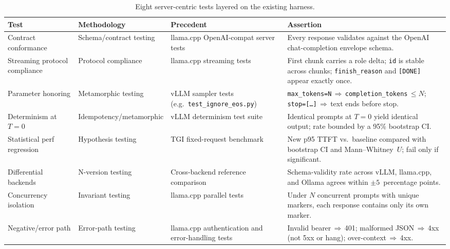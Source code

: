 \documentclass[sigconf,nonacm]{acmart}
\begin{document}
\begin{table}[!tbp]
\centering
\caption{Eight server-centric tests layered on the existing harness.}
\label{tab:methodology}
\small
\begin{tabular}{@{}p{2.8cm}p{3.0cm}p{3.1cm}p{6.8cm}@{}}
\toprule
\textbf{Test} & \textbf{Methodology} & \textbf{Precedent} & \textbf{Assertion} \\
\midrule
Contract conformance & Schema/contract testing & llama.cpp
OpenAI-compat server tests &
Every response validates against the OpenAI chat-completion envelope schema. \\
Streaming protocol compliance & Protocol compliance & llama.cpp streaming
tests &
First chunk carries a role delta; \texttt{id} is stable across chunks;
\texttt{finish\_reason} and \texttt{[DONE]} appear exactly once. \\
Parameter honoring & Metamorphic testing & vLLM sampler tests
(e.g.\ \texttt{test\_ignore\_eos.py}) &
\texttt{max\_tokens=N}\,$\Rightarrow$\,\texttt{completion\_tokens}$\,\leq N$;
\texttt{stop=[\dots]}\,$\Rightarrow$\,text ends before stop. \\
Determinism at $T{=}0$ & Idempotency/metamorphic & vLLM determinism
test suite &
Identical prompts at $T{=}0$ yield identical output; rate bounded by a
95\% bootstrap CI. \\
Statistical perf regression & Hypothesis testing & TGI fixed-request
benchmark~\cite{tgi} &
New p95 TTFT vs.\ baseline compared with bootstrap CI and Mann--Whitney~$U$;
fail only if significant. \\
Differential backends & N-version testing & Cross-backend reference
comparison &
Schema-validity rate across vLLM, llama.cpp, and Ollama agrees within
$\pm 5$~percentage points. \\
Concurrency isolation & Invariant testing & llama.cpp parallel tests &
Under $N$ concurrent prompts with unique markers, each response contains
only its own marker. \\
Negative/error path & Error-path testing & llama.cpp authentication
and error-handling tests &
Invalid bearer\,$\Rightarrow$\,401; malformed JSON\,$\Rightarrow$\,4xx
(not 5xx or hang); over-context\,$\Rightarrow$\,4xx. \\
\bottomrule
\end{tabular}
\end{table}
\end{document}
